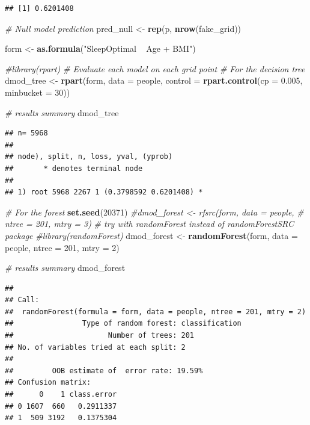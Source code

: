 \documentclass[]{article}
\newenvironment{Shaded}{\begin{snugshade}}{\end{snugshade}}
\newcommand{\KeywordTok}[1]{\textcolor[rgb]{0.13,0.29,0.53}{\textbf{{#1}}}}
\newcommand{\DataTypeTok}[1]{\textcolor[rgb]{0.13,0.29,0.53}{{#1}}}
\newcommand{\DecValTok}[1]{\textcolor[rgb]{0.00,0.00,0.81}{{#1}}}
\newcommand{\FloatTok}[1]{\textcolor[rgb]{0.00,0.00,0.81}{{#1}}}
\newcommand{\StringTok}[1]{\textcolor[rgb]{0.31,0.60,0.02}{{#1}}}
\newcommand{\CommentTok}[1]{\textcolor[rgb]{0.56,0.35,0.01}{\textit{{#1}}}}
\newcommand{\NormalTok}[1]{{#1}}
\begin{document}
\begin{verbatim}
## [1] 0.6201408
\end{verbatim}

\begin{Shaded}
\begin{Highlighting}[]
\CommentTok{# Null model prediction}
\NormalTok{pred_null <-}\StringTok{ }\KeywordTok{rep}\NormalTok{(p, }\KeywordTok{nrow}\NormalTok{(fake_grid))}

\NormalTok{form <-}\StringTok{ }\KeywordTok{as.formula}\NormalTok{(}\StringTok{"SleepOptimal ~ Age + BMI"}\NormalTok{)}

\CommentTok{#library(rpart)}
\CommentTok{# Evaluate each model on each grid point}
\CommentTok{# For the decision tree}
\NormalTok{dmod_tree <-}\StringTok{ }\KeywordTok{rpart}\NormalTok{(form, }\DataTypeTok{data =} \NormalTok{people, }
                   \DataTypeTok{control =} \KeywordTok{rpart.control}\NormalTok{(}\DataTypeTok{cp =} \FloatTok{0.005}\NormalTok{, }\DataTypeTok{minbucket =} \DecValTok{30}\NormalTok{))}

\CommentTok{# results summary}
\NormalTok{dmod_tree}
\end{Highlighting}
\end{Shaded}

\begin{verbatim}
## n= 5968 
## 
## node), split, n, loss, yval, (yprob)
##       * denotes terminal node
## 
## 1) root 5968 2267 1 (0.3798592 0.6201408) *
\end{verbatim}

\begin{Shaded}
\begin{Highlighting}[]
\CommentTok{# For the forest}
\KeywordTok{set.seed}\NormalTok{(}\DecValTok{20371}\NormalTok{)}
\CommentTok{#dmod_forest <- rfsrc(form, data = people, }
\CommentTok{#                     ntree = 201, mtry = 3)}
\CommentTok{# try with randomForest instead of randomForestSRC package}
\CommentTok{#library(randomForest)}
\NormalTok{dmod_forest <-}\StringTok{ }\KeywordTok{randomForest}\NormalTok{(form, }\DataTypeTok{data =} \NormalTok{people, }
                     \DataTypeTok{ntree =} \DecValTok{201}\NormalTok{, }\DataTypeTok{mtry =} \DecValTok{2}\NormalTok{)}

\CommentTok{# results summary}
\NormalTok{dmod_forest}
\end{Highlighting}
\end{Shaded}

\begin{verbatim}
## 
## Call:
##  randomForest(formula = form, data = people, ntree = 201, mtry = 2) 
##                Type of random forest: classification
##                      Number of trees: 201
## No. of variables tried at each split: 2
## 
##         OOB estimate of  error rate: 19.59%
## Confusion matrix:
##      0    1 class.error
## 0 1607  660   0.2911337
## 1  509 3192   0.1375304
\end{verbatim}
\end{document}
